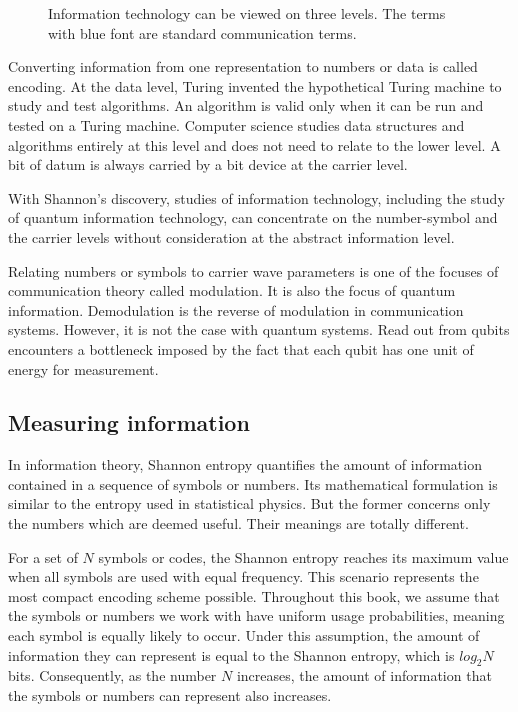 \documentclass[oneside, letter, 12pt]{book}
\begin{document}
\begin{figure}
\begin{flushleft}
\begin{tikzpicture}
\end{tikzpicture}
\end{flushleft}
    \caption{Information technology can be viewed on three levels. The terms with blue font are standard communication terms.}
\end{figure}

Converting information from one representation to numbers or data is called encoding. At the data level, Turing invented the hypothetical Turing machine to study and test algorithms. An algorithm is valid only when it can be run and tested on a Turing machine. Computer science studies data structures and algorithms entirely at this level and does not need to relate to the lower level. A bit of datum is always carried by a bit device at the carrier level.

With Shannon's discovery, studies of information technology, including the study of quantum information technology, can concentrate on the number-symbol and the carrier levels without consideration at the abstract information level.

Relating numbers or symbols to carrier wave parameters is one of the focuses of communication theory called modulation. It is also the focus of quantum information. Demodulation is the reverse of modulation in communication systems. However, it is not the case with quantum systems. Read out from qubits encounters a bottleneck imposed by the fact that each qubit has one unit of energy for measurement.

\subsection{Measuring information}
In information theory, Shannon entropy quantifies the amount of information contained in a sequence of symbols or numbers. Its mathematical formulation is similar to the entropy used in statistical physics. But the former concerns only the numbers which are deemed useful. Their meanings are totally different.

For a set of $N$ symbols or codes, the Shannon entropy reaches its maximum value when all symbols are used with equal frequency. This scenario represents the most compact encoding scheme possible. Throughout this book, we assume that the symbols or numbers we work with have uniform usage probabilities, meaning each symbol is equally likely to occur. Under this assumption, the amount of information they can represent is equal to the Shannon entropy, which is $log_2 N$ bits. Consequently, as the number $N$ increases, the amount of information that the symbols or numbers can represent also increases.
\end{document}
